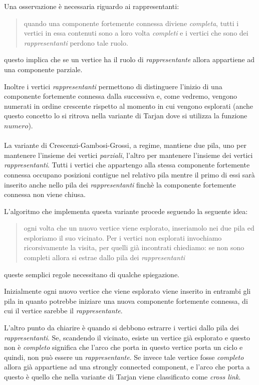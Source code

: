 Una osservazione \`e necessaria riguardo ai rappresentanti:
\begin{quotation}
  quando una componente fortemente connessa diviene \emph{completa},
  tutti i vertici in essa contenuti sono a loro volta \emph{completi}
  e i vertici che sono dei \emph{rappresentanti} perdono tale ruolo.
\end{quotation}
questo implica che se un vertice ha il ruolo di \emph{rappresentante}
allora appartiene ad una componente parziale. 

Inoltre i vertici \emph{rappresentanti} permettono di distinguere
l'inizio di una componente fortemente connessa dalla successiva e, come
vedremo, vengono numerati in ordine crescente rispetto al momento in
cui vengono esplorati (anche questo concetto lo si ritrova nella
variante di Tarjan dove si utilizza la funzione $numero$).
\\\\
La variante di Crescenzi-Gambosi-Grossi, a regime, mantiene due pila,
uno per mantenere l'insieme dei vertici \emph{parziali}, l'altro per
mantenere l'insieme dei vertici \emph{rappresentanti}. Tutti i vertici
che appartengo alla stessa componente fortemente connessa occupano
posizioni contigue nel relativo pila mentre il primo di essi sar\`a
inserito anche nello pila dei \emph{rappresentanti} finch\`e la
componente fortemente connessa non viene chiusa.

L'algoritmo che implementa questa variante procede seguendo la
seguente idea:
\begin{quotation}
  ogni volta che un nuovo vertice viene esplorato, inseriamolo nei due
  pila ed esploriamo il suo vicinato. Per i vertici non esplorati
  invochiamo ricorsivamente la visita, per quelli gi\`a incontrati
  chiediamo: se non sono completi allora si estrae dallo pila dei
  \emph{rappresentanti}
\end{quotation}
queste semplici regole necessitano di qualche
spiegazione. 

Inizialmente ogni nuovo vertice che viene esplorato viene
inserito in entrambi gli pila in quanto potrebbe iniziare una nuova
componente fortemente connessa, di cui il vertice sarebbe il
\emph{rappresentante}. 

L'altro punto da chiarire \`e quando si debbono estrarre i vertici
dallo pila dei \emph{rappresentanti}. Se, scandendo il vicinato,
esiste un vertice gi\`a esplorato e questo non \`e \emph{completo}
significa che l'arco che porta in questo vertice porta un ciclo e
quindi, non pu\`o essere un \emph{rappresentante}. Se invece tale
vertice fosse \emph{completo} allora gi\`a appartiene ad una strongly
connected component, e l'arco che porta a questo \`e quello che nella
variante di Tarjan viene classificato come \emph{cross link}.

